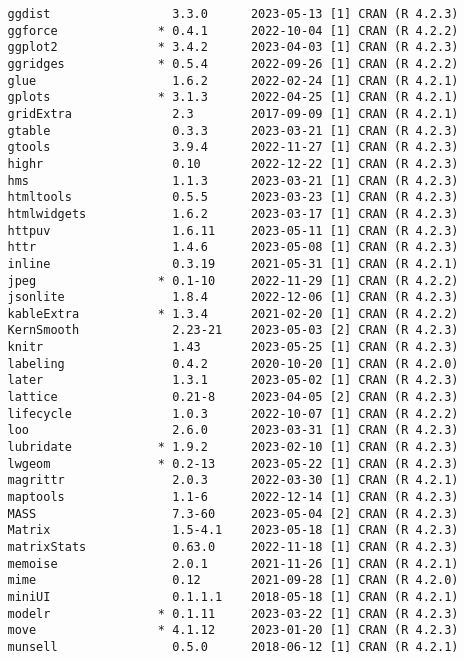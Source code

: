 \documentclass[twoside,12pt,final]{ucthesis-CA2012}
\begin{document}
\begin{ucmainmatter}
\begin{verbatim}
   ggdist                 3.3.0      2023-05-13 [1] CRAN (R 4.2.3)
   ggforce              * 0.4.1      2022-10-04 [1] CRAN (R 4.2.2)
   ggplot2              * 3.4.2      2023-04-03 [1] CRAN (R 4.2.3)
   ggridges             * 0.5.4      2022-09-26 [1] CRAN (R 4.2.2)
   glue                   1.6.2      2022-02-24 [1] CRAN (R 4.2.1)
   gplots               * 3.1.3      2022-04-25 [1] CRAN (R 4.2.1)
   gridExtra              2.3        2017-09-09 [1] CRAN (R 4.2.1)
   gtable                 0.3.3      2023-03-21 [1] CRAN (R 4.2.3)
   gtools                 3.9.4      2022-11-27 [1] CRAN (R 4.2.3)
   highr                  0.10       2022-12-22 [1] CRAN (R 4.2.3)
   hms                    1.1.3      2023-03-21 [1] CRAN (R 4.2.3)
   htmltools              0.5.5      2023-03-23 [1] CRAN (R 4.2.3)
   htmlwidgets            1.6.2      2023-03-17 [1] CRAN (R 4.2.3)
   httpuv                 1.6.11     2023-05-11 [1] CRAN (R 4.2.3)
   httr                   1.4.6      2023-05-08 [1] CRAN (R 4.2.3)
   inline                 0.3.19     2021-05-31 [1] CRAN (R 4.2.1)
   jpeg                 * 0.1-10     2022-11-29 [1] CRAN (R 4.2.2)
   jsonlite               1.8.4      2022-12-06 [1] CRAN (R 4.2.3)
   kableExtra           * 1.3.4      2021-02-20 [1] CRAN (R 4.2.2)
   KernSmooth             2.23-21    2023-05-03 [2] CRAN (R 4.2.3)
   knitr                  1.43       2023-05-25 [1] CRAN (R 4.2.3)
   labeling               0.4.2      2020-10-20 [1] CRAN (R 4.2.0)
   later                  1.3.1      2023-05-02 [1] CRAN (R 4.2.3)
   lattice                0.21-8     2023-04-05 [2] CRAN (R 4.2.3)
   lifecycle              1.0.3      2022-10-07 [1] CRAN (R 4.2.2)
   loo                    2.6.0      2023-03-31 [1] CRAN (R 4.2.3)
   lubridate            * 1.9.2      2023-02-10 [1] CRAN (R 4.2.3)
   lwgeom               * 0.2-13     2023-05-22 [1] CRAN (R 4.2.3)
   magrittr               2.0.3      2022-03-30 [1] CRAN (R 4.2.1)
   maptools               1.1-6      2022-12-14 [1] CRAN (R 4.2.3)
   MASS                   7.3-60     2023-05-04 [2] CRAN (R 4.2.3)
   Matrix                 1.5-4.1    2023-05-18 [1] CRAN (R 4.2.3)
   matrixStats            0.63.0     2022-11-18 [1] CRAN (R 4.2.3)
   memoise                2.0.1      2021-11-26 [1] CRAN (R 4.2.1)
   mime                   0.12       2021-09-28 [1] CRAN (R 4.2.0)
   miniUI                 0.1.1.1    2018-05-18 [1] CRAN (R 4.2.1)
   modelr               * 0.1.11     2023-03-22 [1] CRAN (R 4.2.3)
   move                 * 4.1.12     2023-01-20 [1] CRAN (R 4.2.3)
   munsell                0.5.0      2018-06-12 [1] CRAN (R 4.2.1)

\end{verbatim}
\end{ucmainmatter}
\end{document}
